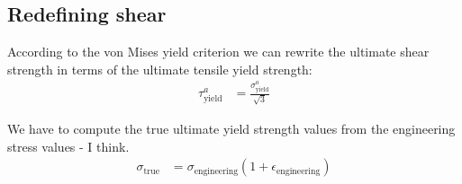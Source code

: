 \subsection{Redefining shear}

According to the von Mises yield criterion we can rewrite the ultimate shear strength in terms of the ultimate tensile yield strength:
\begin{align*}
	\tau^a_\text{yield} &= \frac{ \sigma^a_\text{yield} }{\sqrt{3}} 
\end{align*}

We have to compute the true ultimate yield strength values from the engineering stress values - I think.
\begin{align*}
	\sigma_\text{true} %
	&= \sigma_\text{engineering} (1 + \epsilon_\text{engineering})
\end{align*}
